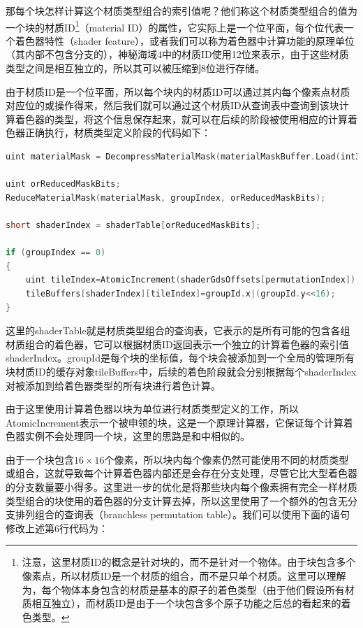 那每个块怎样计算这个材质类型组合的索引值呢？他们称这个材质类型组合的值为一个块的材质ID\footnote{注意，这里材质ID的概念是针对块的，而不是针对一个物体。由于块包含多个像素点，所以材质ID是一个材质的组合，而不是只单个材质。这里可以理解为，每个物体本身包含的材质是基本的原子的着色类型（由于他们假设所有材质相互独立），而材质ID是由于一个块包含多个原子功能之后总的看起来的着色类型。}（material ID）的属性，它实际上是一个位平面，每个位代表一个着色器特性（shader feature），或者我们可以称为着色器中计算功能的原理单位（其内部不包含分支的），神秘海域4中的材质ID使用12位来表示，由于这些材质类型之间是相互独立的，所以其可以被压缩到8位进行存储。

由于材质ID是一个位平面，所以每个块内的材质ID可以通过其内每个像素点材质对应位的或操作得来，然后我们就可以通过这个材质ID从查询表中查询到该块计算着色器的类型，将这个信息保存起来，就可以在后续的阶段被使用相应的计算着色器正确执行，材质类型定义阶段的代码如下：

\begin{lstlisting}[language=C++]
uint materialMask = DecompressMaterialMask(materialMaskBuffer.Load(int3(screenCoord, 0)));

uint orReducedMaskBits;
ReduceMaterialMask(materialMask, groupIndex, orReducedMaskBits);

short shaderIndex = shaderTable[orReducedMaskBits];

if (groupIndex == 0)
{
	uint tileIndex=AtomicIncrement(shaderGdsOffsets[permutationIndex]);
	tileBuffers[shaderIndex][tileIndex]=groupId.x|(groupId.y<<16);
}
\end{lstlisting}

这里的shaderTable就是材质类型组合的查询表，它表示的是所有可能的包含各组材质组合的着色器，它可以根据材质ID返回表示一个独立的计算着色器的索引值shaderIndex。groupId是每个块的坐标值，每个块会被添加到一个全局的管理所有块材质ID的缓存对象tileBuffers中，后续的着色阶段就会分别根据每个shaderIndex对被添加到给着色器类型的所有块进行着色计算。

由于这里使用计算着色器以块为单位进行材质类型定义的工作，所以AtomicIncrement表示一个被申领的块，这是一个原理计算器，它保证每个计算着色器实例不会处理同一个块，这里的思路是和\cite{a:SPU-basedDeferredShadingforBattlefield3onPlaystation3}中相似的。

由于一个块包含$16\times 16$个像素，所以块内每个像素仍然可能使用不同的材质类型或组合，这就导致每个计算着色器内部还是会存在分支处理，尽管它比大型着色器的分支数量要小得多。这里进一步的优化是将那些块内每个像素拥有完全一样材质类型组合的块使用的着色器的分支计算去掉，所以这里使用了一个额外的包含无分支排列组合的查询表（branchless permutation table）。我们可以使用下面的语句修改上述第6行代码为：

